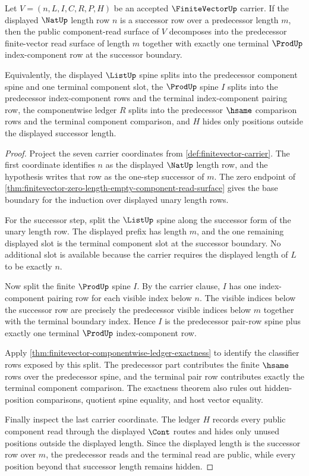 \begin{theorem}
\label{thm:finitevector-successor-component-read-surface}
Let $V=(n,L,I,C,R,P,H)$ be an accepted $\FiniteVectorUp$ carrier. If the displayed $\NatUp$ length row $n$ is a successor row over a predecessor length $m$, then the public component-read surface of $V$ decomposes into the predecessor finite-vector read surface of length $m$ together with exactly one terminal $\ProdUp$ index-component row at the successor boundary.

Equivalently, the displayed $\ListUp$ spine splits into the predecessor component spine and one terminal component slot, the $\ProdUp$ spine $I$ splits into the predecessor index-component rows and the terminal index-component pairing row, the componentwise ledger $R$ splits into the predecessor $\hsame$ comparison rows and the terminal component comparison, and $H$ hides only positions outside the displayed successor length.
\end{theorem}
\begin{proof}
Project the seven carrier coordinates from \autoref{def:finitevector-carrier}. The first coordinate identifies $n$ as the displayed $\NatUp$ length row, and the hypothesis writes that row as the one-step successor of $m$. The zero endpoint of \autoref{thm:finitevector-zero-length-empty-component-read-surface} gives the base boundary for the induction over displayed unary length rows.

For the successor step, split the $\ListUp$ spine along the successor form of the unary length row. The displayed prefix has length $m$, and the one remaining displayed slot is the terminal component slot at the successor boundary. No additional slot is available because the carrier requires the displayed length of $L$ to be exactly $n$.

Now split the finite $\ProdUp$ spine $I$. By the carrier clause, $I$ has one index-component pairing row for each visible index below $n$. The visible indices below the successor row are precisely the predecessor visible indices below $m$ together with the terminal boundary index. Hence $I$ is the predecessor pair-row spine plus exactly one terminal $\ProdUp$ index-component row.

Apply \autoref{thm:finitevector-componentwise-ledger-exactness} to identify the classifier rows exposed by this split. The predecessor part contributes the finite $\hsame$ rows over the predecessor spine, and the terminal pair row contributes exactly the terminal component comparison. The exactness theorem also rules out hidden-position comparisons, quotient spine equality, and host vector equality.

Finally inspect the last carrier coordinate. The ledger $H$ records every public component read through the displayed $\Cont$ routes and hides only unused positions outside the displayed length. Since the displayed length is the successor row over $m$, the predecessor reads and the terminal read are public, while every position beyond that successor length remains hidden.
\end{proof}

